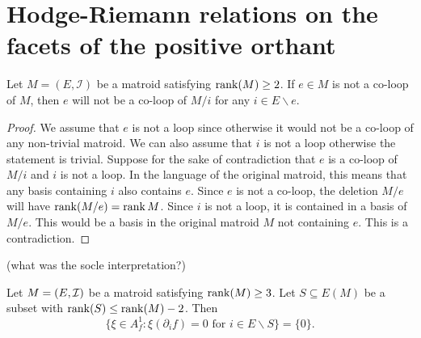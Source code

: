 \documentclass{puthesis-UG}
\begin{document}
\section{Hodge-Riemann relations on the facets of the positive orthant}

\begin{lem} \label{contracting-stays-not-a-coloop}
	Let $M = (E, \mathcal{I})$ be a matroid satisfying $\operatorname{rank} (M) \geq 2$. If $e \in M$ is not a co-loop of $M$, then $e$ will not be a co-loop of $M / i$ for any $i \in E \backslash e$. 
\end{lem}

\begin{proof}
	We assume that $e$ is not a loop since otherwise it would not be a co-loop of any non-trivial matroid. We can also assume that $i$ is not a loop otherwise the statement is trivial. Suppose for the sake of contradiction that $e$ is a co-loop of $M/i$ and $i$ is not a loop. In the language of the original matroid, this means that any basis containing $i$ also contains $e$. Since $e$ is not a co-loop, the deletion $M / e$ will have $\operatorname{rank} (M / e) = \operatorname{rank} M$. Since $i$ is not a loop, it is contained in a basis of $M / e$. This would be a basis in the original matroid $M$ not containing $e$. This is a contradiction. 
\end{proof}

(what was the socle interpretation?)
\begin{thm} \label{socle-socle-socle}
	Let $M = (E, \mathcal{I})$ be a matroid satisfying $\operatorname{rank} (M) \geq 3$. Let $S \subseteq E(M)$ be a subset with $\operatorname{rank} (S) \leq \operatorname{rank} (M)-2$. Then 
	\[
		\{\xi \in A_f^1 : \xi (\partial_i f) = 0 \text{ for } i \in E \backslash S\} = \{0\}.
	\]
\end{thm}
\end{document}
